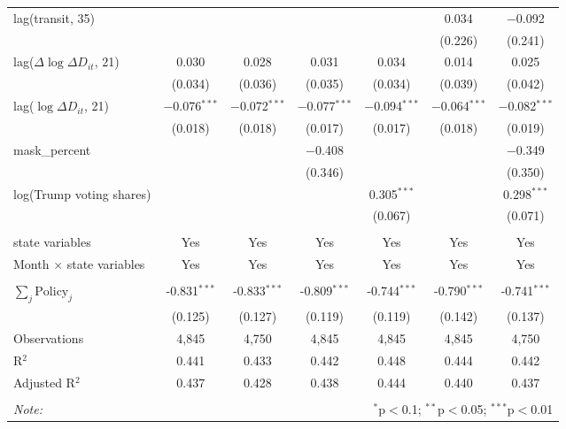 \begin{tabular}{@{\extracolsep{1pt}}lcccccc}
  lag(transit, 35) &  &  &  &  & 0.034 & $-$0.092 \\ 
  &  &  &  &  & (0.226) & (0.241) \\ 
  lag($\Delta \log \Delta D_{it}$, 21) & 0.030 & 0.028 & 0.031 & 0.034 & 0.014 & 0.025 \\ 
  & (0.034) & (0.036) & (0.035) & (0.034) & (0.039) & (0.042) \\ 
  lag($\log \Delta D_{it}$, 21) & $-$0.076$^{***}$ & $-$0.072$^{***}$ & $-$0.077$^{***}$ & $-$0.094$^{***}$ & $-$0.064$^{***}$ & $-$0.082$^{***}$ \\ 
  & (0.018) & (0.018) & (0.017) & (0.017) & (0.018) & (0.019) \\ 
  mask\_percent &  &  & $-$0.408 &  &  & $-$0.349 \\ 
  &  &  & (0.346) &  &  & (0.350) \\ 
  log(Trump voting shares) &  &  &  & 0.305$^{***}$ &  & 0.298$^{***}$ \\ 
  &  &  &  & (0.067) &  & (0.071) \\ 
 \hline \\[-1.8ex] 
state variables & Yes & Yes & Yes & Yes & Yes & Yes \\ 
Month $\times$ state variables & Yes & Yes & Yes & Yes & Yes & Yes \\ 
\hline \\[-1.8ex] 
$\sum_j \mathrm{Policy}_j$ & -0.831$^{***}$ & -0.833$^{***}$ & -0.809$^{***}$ & -0.744$^{***}$ & -0.790$^{***}$ & -0.741$^{***}$ \\ 
 & (0.125) & (0.127) & (0.119) & (0.119) & (0.142) & (0.137) \\ 
Observations & 4,845 & 4,750 & 4,845 & 4,845 & 4,845 & 4,750 \\ 
R$^{2}$ & 0.441 & 0.433 & 0.442 & 0.448 & 0.444 & 0.442 \\ 
Adjusted R$^{2}$ & 0.437 & 0.428 & 0.438 & 0.444 & 0.440 & 0.437 \\ 
\hline 
\hline \\[-1.8ex] 
\textit{Note:}  & \multicolumn{6}{r}{$^{*}$p$<$0.1; $^{**}$p$<$0.05; $^{***}$p$<$0.01} \\ 
\end{tabular} 